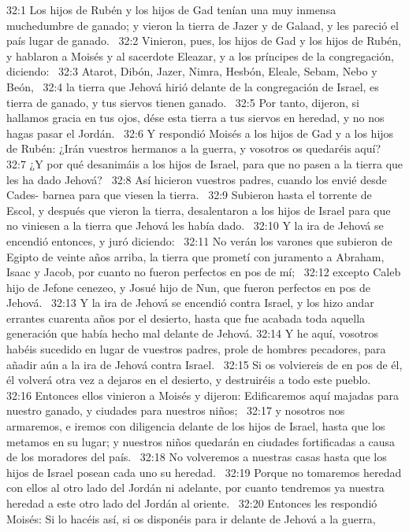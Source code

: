 32:1 Los hijos de Rubén y los hijos de Gad tenían una muy inmensa muchedumbre de ganado; y vieron la tierra de Jazer y de Galaad, y les pareció el país lugar de ganado.  
32:2 Vinieron, pues, los hijos de Gad y los hijos de Rubén, y hablaron a Moisés y al sacerdote Eleazar, y a los príncipes de la congregación, diciendo:  
32:3 Atarot, Dibón, Jazer, Nimra, Hesbón, Eleale, Sebam, Nebo y Beón,  
32:4 la tierra que Jehová hirió delante de la congregación de Israel, es tierra de ganado, y tus siervos tienen ganado.  
32:5 Por tanto, dijeron, si hallamos gracia en tus ojos, dése esta tierra a tus siervos en heredad, y no nos hagas pasar el Jordán.  
32:6 Y respondió Moisés a los hijos de Gad y a los hijos de Rubén: ¿Irán vuestros hermanos a la guerra, y vosotros os quedaréis aquí?  
32:7 ¿Y por qué desanimáis a los hijos de Israel, para que no pasen a la tierra que les ha dado Jehová?  
32:8 Así hicieron vuestros padres, cuando los envié desde Cades- barnea para que viesen la tierra.  
32:9 Subieron hasta el torrente de Escol, y después que vieron la tierra, desalentaron a los hijos de Israel para que no viniesen a la tierra que Jehová les había dado.  
32:10 Y la ira de Jehová se encendió entonces, y juró diciendo:  
32:11 No verán los varones que subieron de Egipto de veinte años arriba, la tierra que prometí con juramento a Abraham, Isaac y Jacob, por cuanto no fueron perfectos en pos de mí;  
32:12 excepto Caleb hijo de Jefone cenezeo, y Josué hijo de Nun, que fueron perfectos en pos de Jehová.  
32:13 Y la ira de Jehová se encendió contra Israel, y los hizo andar errantes cuarenta años por el desierto, hasta que fue acabada toda aquella generación que había hecho mal delante de Jehová. 
32:14 Y he aquí, vosotros habéis sucedido en lugar de vuestros padres, prole de hombres pecadores, para añadir aún a la ira de Jehová contra Israel.  
32:15 Si os volviereis de en pos de él, él volverá otra vez a dejaros en el desierto, y destruiréis a todo este pueblo.  
32:16 Entonces ellos vinieron a Moisés y dijeron: Edificaremos aquí majadas para nuestro ganado, y ciudades para nuestros niños;  
32:17 y nosotros nos armaremos, e iremos con diligencia delante de los hijos de Israel, hasta que los metamos en su lugar; y nuestros niños quedarán en ciudades fortificadas a causa de los moradores del país.  
32:18 No volveremos a nuestras casas hasta que los hijos de Israel posean cada uno su heredad.  
32:19 Porque no tomaremos heredad con ellos al otro lado del Jordán ni adelante, por cuanto tendremos ya nuestra heredad a este otro lado del Jordán al oriente.  
32:20 Entonces les respondió Moisés: Si lo hacéis así, si os disponéis para ir delante de Jehová a la guerra,  
